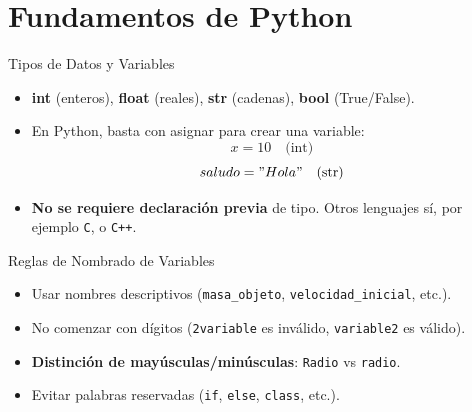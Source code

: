 \documentclass[10pt]{beamer}
\begin{document}
\section{Fundamentos de Python}

\begin{frame}{Tipos de Datos y Variables}
  \begin{itemize}
    \item \textbf{int} (enteros), \textbf{float} (reales), \textbf{str} (cadenas), \textbf{bool} (True/False).
    \item En Python, basta con asignar para crear una variable:
          \[
            x = 10 \quad \text{(int)}
          \]
          \[
            saludo = "Hola" \quad \text{(str)}
          \]
    \item \textbf{No se requiere declaración previa} de tipo. Otros lenguajes sí, por ejemplo \texttt{C}, o \texttt{C++}.
  \end{itemize}
\end{frame}

\begin{frame}{Reglas de Nombrado de Variables}
  \begin{itemize}
    \item Usar nombres descriptivos (\texttt{masa\_objeto}, \texttt{velocidad\_inicial}, etc.).
    \item No comenzar con dígitos (\texttt{2variable} es inválido, \texttt{variable2} es válido).
    \item \textbf{Distinción de mayúsculas/minúsculas}: \texttt{Radio} vs \texttt{radio}.
    \item Evitar palabras reservadas (\texttt{if}, \texttt{else}, \texttt{class}, etc.).
  \end{itemize}
\end{frame}
\end{document}
